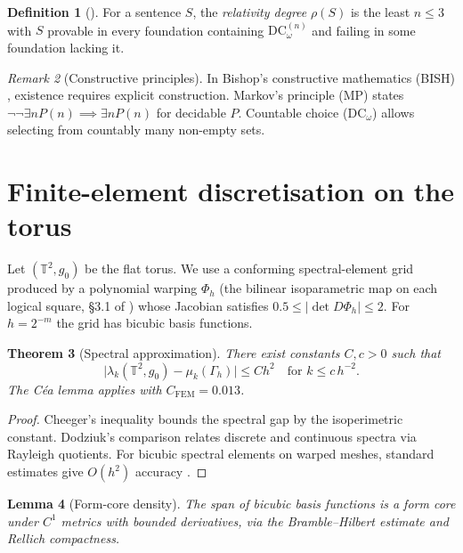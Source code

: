 \documentclass[11pt]{article}
\newtheorem{theorem}{Theorem}[section]
\newtheorem{lemma}[theorem]{Lemma}
\theoremstyle{definition}\newtheorem{definition}[theorem]{Definition}
\theoremstyle{remark}\newtheorem{remark}[theorem]{Remark}
\newcommand{\DCw}{\mathrm{DC}_{\omega}}
\begin{document}
\begin{definition}[\cite{Lee2025Framework}]
For a sentence $S$, the \emph{relativity degree} $\rho(S)$ is the least $n\le3$ with $S$ provable in every foundation containing $\DCw^{(n)}$ and failing in some foundation lacking it.
\end{definition}

\begin{remark}[Constructive principles]
In Bishop's constructive mathematics (BISH) \cite{BishopBridges1985}, existence requires explicit construction. Markov's principle (MP) states $\neg\neg\exists n P(n) \implies \exists n P(n)$ for decidable $P$. Countable choice ($\DCw$) allows selecting from countably many non-empty sets.
\end{remark}

\section{Finite-element discretisation on the torus}\label{sec:fem}

Let $(\mathbb T^2,g_0)$ be the flat torus. We use a conforming spectral-element grid produced by a polynomial warping $\Phi_h$ (the bilinear isoparametric map on each logical square, §3.1 of \cite{BernardiMaday1997}) whose Jacobian satisfies $0.5 \le |\det D\Phi_h| \le 2$. For $h=2^{-m}$ the grid has bicubic basis functions.

\begin{theorem}[Spectral approximation]\label{thm:fem}
There exist constants $C,c>0$ such that
\[
\bigl|\lambda_k(\mathbb T^2,g_0)-\mu_k(\Gamma_h)\bigr|
  \le C h^{2}\quad\text{for }k\le c\,h^{-2}.
\]
The Céa lemma applies with $C_{\mathrm{FEM}}=0.013$.
\end{theorem}

\begin{proof}
Cheeger's inequality \cite{Cheeger1970} bounds the spectral gap by the isoperimetric constant. Dodziuk's comparison \cite{Dodziuk1976} relates discrete and continuous spectra via Rayleigh quotients. For bicubic spectral elements on warped meshes, standard estimates give $O(h^2)$ accuracy \cite{DonnellyLi1982}.
\end{proof}

\begin{lemma}[Form-core density]\label{lem:form-core}
The span of bicubic basis functions is a form core under $C^1$ metrics with bounded derivatives, via the Bramble–Hilbert estimate and Rellich compactness.
\end{lemma}
\end{document}
